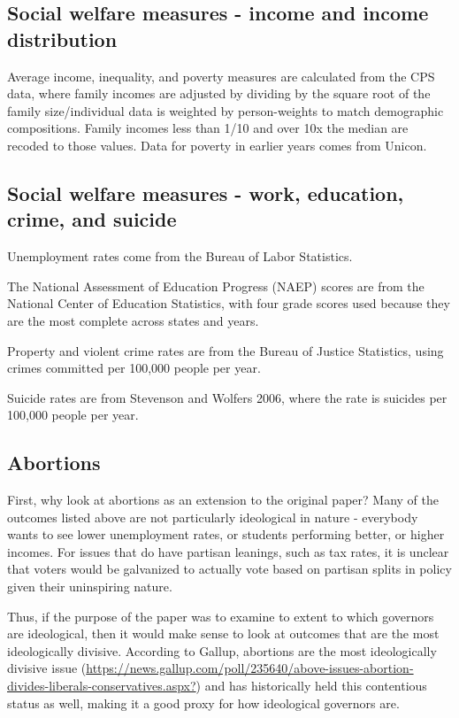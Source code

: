 \documentclass{article}
\begin{document}
\subsection{Social welfare measures - income and income distribution}

Average income, inequality, and poverty measures are calculated from the CPS data, where family incomes are adjusted by dividing by the square root of the family size/individual data is weighted by person-weights to match demographic compositions. Family incomes less than 1/10 and over 10x the median are recoded to those values. Data for poverty in earlier years comes from Unicon.

\subsection{Social welfare measures - work, education, crime, and suicide}

Unemployment rates come from the Bureau of Labor Statistics.

The National Assessment of Education Progress (NAEP) scores are from the National Center of Education Statistics, with four grade scores used because they are the most complete across states and years.

Property and violent crime rates are from the Bureau of Justice Statistics, using crimes committed per 100,000 people per year.

Suicide rates are from Stevenson and Wolfers 2006, where the rate is suicides per 100,000 people per year.

\subsection{Abortions}

First, why look at abortions as an extension to the original paper? Many of the outcomes listed above are not particularly ideological in nature - everybody wants to see lower unemployment rates, or students performing better, or higher incomes. For issues that do have partisan leanings, such as tax rates, it is unclear that voters would be galvanized to actually vote based on partisan splits in policy given their uninspiring nature.

Thus, if the purpose of the paper was to examine to extent to which governors are ideological, then it would make sense to look at outcomes that are the most ideologically divisive. According to Gallup, abortions are the most ideologically divisive issue (\url{https://news.gallup.com/poll/235640/above-issues-abortion-divides-liberals-conservatives.aspx?}) and has historically held this contentious status as well, making it a good proxy for how ideological governors are.
\end{document}
